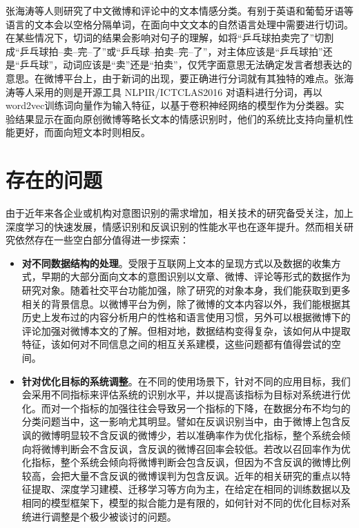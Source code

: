 张海涛等人\cite{zhang2018jiyu}则研究了中文微博和评论中的文本情感分类。有别于英语和葡萄牙语等语言的文本会以空格分隔单词，在面向中文文本的自然语言处理中需要进行切词。在某些情况下，切词的结果会影响对句子的理解，如将“乒乓球拍卖完了”切割成“乒乓球拍--卖--完--了”或“乒乓球--拍卖--完--了”，对主体应该是“乒乓球拍”还是“乒乓球”，动词应该是“卖”还是“拍卖”，仅凭字面意思无法确定发言者想表达的意思。在微博平台上，由于新词的出现，要正确进行分词就有其独特的难点。张海涛等人采用的则是开源工具 NLPIR/ICTCLAS2016 对语料进行分词，再以word2vec训练词向量作为输入特征，以基于卷积神经网络的模型作为分类器。实验结果显示在面向原创微博等略长文本的情感识别时，他们的系统比支持向量机性能更好，而面向短文本时则相反。

\section{存在的问题}

由于近年来各企业或机构对意图识别的需求增加，相关技术的研究备受关注，加上深度学习的快速发展，情感识别和反讽识别的性能水平也在逐年提升。然而相关研究依然存在一些空白部分值得进一步探索：

\begin{itemize}

\item {\bf 对不同数据结构的处理}。受限于互联网上文本的呈现方式以及数据的收集方式，早期的大部分面向文本的意图识别以文章、微博、评论等形式的数据作为研究对象。随着社交平台功能加强，除了研究的对象本身，我们能获取到更多相关的背景信息。以微博平台为例，除了微博的文本内容以外，我们能根据其历史上发布过的内容分析用户的性格和语言使用习惯，另外可以根据微博下的评论加强对微博本文的了解。但相对地，数据结构变得复杂，该如何从中提取特征，该如何对不同信息之间的相互关系建模，这些问题都有值得尝试的空间。

\item {\bf 针对优化目标的系统调整}。在不同的使用场景下，针对不同的应用目标，我们会采用不同指标来评估系统的识别水平，并以提高该指标为目标对系统进行优化。而对一个指标的加强往往会导致另一个指标的下降，在数据分布不均匀的分类问题当中，这一影响尤其明显。譬如在反讽识别当中，由于微博上包含反讽的微博明显较不含反讽的微博少，若以准确率作为优化指标，整个系统会倾向将微博判断会不含反讽，含反讽的微博召回率会较低。若改以召回率作为优化指标，整个系统会倾向将微博判断会包含反讽，但因为不含反讽的微博比例较高，会把大量不含反讽的微博误判为包含反讽。近年的相关研究的重点以特征提取、深度学习建模、迁移学习等方向为主，在给定在相同的训练数据以及相同的模型框架下，模型的拟合能力是有限的，如何针对不同的优化目标对系统进行调整是个极少被谈讨的问题。

\end{itemize}

